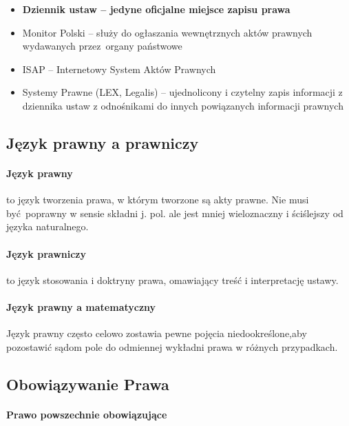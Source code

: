 \documentclass{article}
\begin{document}
\begin{itemize}
  \item \textbf{Dziennik ustaw -- jedyne oficjalne miejsce zapisu prawa}
  \item Monitor Polski -- służy do ogłaszania wewnętrznych aktów prawnych wydawanych
        przez~organy państwowe
  \item ISAP -- Internetowy System Aktów Prawnych
  \item Systemy Prawne (LEX, Legalis) -- ujednolicony i czytelny zapis informacji
        z dziennika ustaw z odnośnikami do innych powiązanych informacji prawnych
\end{itemize}

\subsection{Język prawny a prawniczy}

\paragraph{Język prawny}

to język tworzenia prawa, w którym tworzone są akty prawne.
Nie musi być~poprawny w sensie składni j. pol. ale jest mniej wieloznaczny i ściślejszy
od języka naturalnego.

\paragraph{Język prawniczy}

to język stosowania i doktryny prawa, omawiający treść
i interpretację ustawy.

\paragraph{Język prawny a matematyczny}

Język prawny często celowo zostawia pewne pojęcia niedookreślone,aby pozostawić
sądom pole do odmiennej wykładni prawa w różnych przypadkach.

\subsection{Obowiązywanie Prawa}

\paragraph{Prawo powszechnie obowiązujące}
\end{document}
